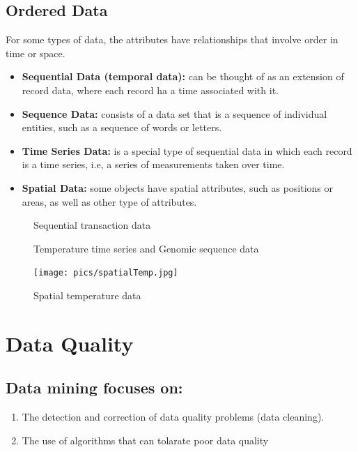		\clearpage
		\subsection{Ordered Data}
		For some types of data, the attributes have relationships that involve order in time or space. 
			\begin{itemize}
				\item {\bf Sequential Data (temporal data):} can be thought of as an extension of record data, 
				where each record ha a time associated with it. 
				\item {\bf Sequence Data:} consists of a data set that is a sequence of individual entities, 
				such as a sequence of words or letters. 
				\item {\bf Time Series Data:} is a special type of sequential data in which each record is a
				time series, i.e, a series of measurements taken over time. 
				\item {\bf Spatial Data:} some objects have spatial attributes, such as positions or areas, as
				well as other type of attributes. 
			\end{itemize}

		\begin{figure}[H]
			\centering
			\caption{Sequential transaction data}
		\end{figure}

		\begin{figure}[H]
			\centering
			\caption{Temperature time series and Genomic sequence data}
		\end{figure}

		\begin{figure}[H]
			\centering
			\texttt{[image: pics/spatialTemp.jpg]}
			\caption{Spatial temperature data}
		\end{figure}


\section{Data Quality}
	
	\subsection*{Data mining focuses on:}
	\begin{enumerate}
		\item The detection and correction of data quality problems (data cleaning).
		\item The use of algorithms that can tolarate poor data quality
	\end{enumerate}

